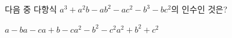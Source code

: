 다음 중 다항식 $a^3+a^2b-ab^2-ac^2-b^3-bc^2$의 인수인 것은?
\begin{choicesii}{$a-b$}{$a-c$}{$a+b-c$}{$a^2-b^2-c^2$}{$a^2+b^2+c^2$}\end{choicesii}
